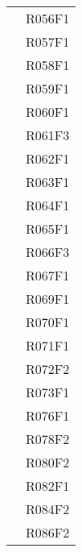 \documentclass[../analisi-dei-requisiti.tex]{subfiles}
\begin{document}
\begin{longtable}[H]{>{\centering}m{5cm} >{\centering}m{5cm}}
                                & R056F1                               \\
                                & R057F1                               \\
                                & R058F1                               \\
                                & R059F1                               \\
                                & R060F1                               \\
                                & R061F3                               \\
                                & R062F1                               \\
                                & R063F1                               \\
                                & R064F1                               \\
                                & R065F1                               \\
                                & R066F3                               \\
                                & R067F1                               \\
                                & R069F1                               \\
                                & R070F1                               \\
                                & R071F1                               \\
                                & R072F2                               \\
                                & R073F1                               \\
                                & R076F1                               \\
                                & R078F2                               \\
                                & R080F2                               \\
                                & R082F1                               \\
                                & R084F2                               \\
                                & R086F2                               \\

\end{longtable}
\end{document}
